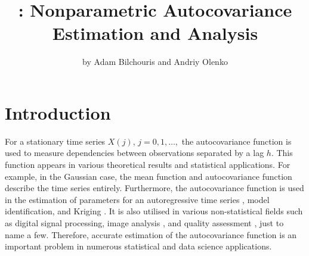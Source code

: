 \title{: Nonparametric Autocovariance Estimation and Analysis}
\author{by Adam Bilchouris and Andriy Olenko}

\maketitle


\section{Introduction}
For a stationary time series \(X(j)\), \(j = 0, 1, \dots, \) the autocovariance function is used to measure dependencies between observations separated by a lag \(h.\)
This function appears in various theoretical results and statistical applications.
For example, in the Gaussian case, the mean function and autocovariance function describe the time series entirely. Furthermore, the autocovariance function is used in the estimation of parameters for an autoregressive time series \citep[Chapter~8.1]{Brockwell1991}, model identification, and Kriging \citep[Chapter~3.2]{Cressie1993}. It is also utilised in various non-statistical fields such as digital signal processing, image analysis \citep[Chapter~3.2]{Bull2021}, and quality assessment \citep{chemo2003}, just to name a few.
Therefore, accurate estimation of the autocovariance function is an important problem in numerous statistical and data science applications.

